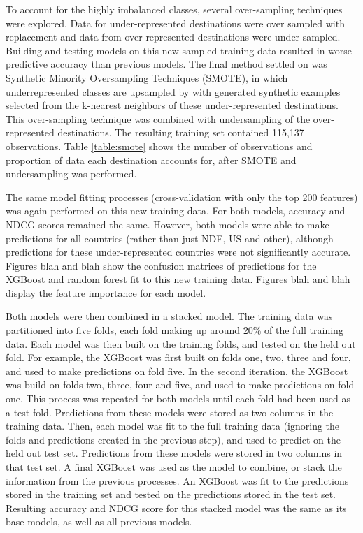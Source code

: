 \documentclass{article}
\begin{document}
To account for the highly imbalanced classes, several over-sampling techniques were explored. Data for under-represented
destinations were over sampled with replacement and data from over-represented destinations were under sampled. 
Building and testing models on this new sampled training data resulted in worse predictive accuracy than previous
models. The final method settled on was Synthetic Minority Oversampling Techniques (SMOTE), in which underrepresented
classes are upsampled by with generated synthetic examples selected from the k-nearest neighbors of these under-represented 
destinations. This over-sampling technique was combined with undersampling of the over-represented destinations. The 
resulting training set contained 115,137 observations. Table \ref{table:smote} shows the number of observations and proportion
of data each destination accounts for, after SMOTE and undersampling was performed. 

The same model fitting processes (cross-validation with only the top 200 features) was again performed 
on this new training data. For both models, accuracy and NDCG scores remained the same. However, both models were 
able to make predictions for all countries (rather than just NDF, US and other), although predictions for these 
under-represented countries were not significantly accurate. Figures blah and blah show the confusion matrices of predictions
for the XGBoost and random forest fit to this new training data. Figures blah and blah display the feature importance 
for each model. 


Both models were then combined in a stacked model. The training data was partitioned into five folds, each 
fold making up around 20\% of the full training data. Each model was then built on the training folds, and 
tested on the held out fold. For example, the XGBoost was first built on folds one, two, three and four, and 
used to make predictions on fold five. In the second iteration, the XGBoost was build on folds two, three, 
four and five, and used to make predictions on fold one. This process was repeated for both models until each 
fold had been used as a test fold. Predictions from these models were stored as two columns in the training data. 
Then, each model was fit to the full training data (ignoring the folds and predictions created in the
previous step), and used to predict on the held out test set. Predictions from these models were stored in two 
columns in that test set. A final XGBoost was used as the model to combine, or stack the information from the 
previous processes. An XGBoost was fit to the predictions stored in the training set and tested on the predictions 
stored in the test set. Resulting accuracy and NDCG score for this stacked model was the same as its base models, 
as well as all previous models. 
\end{document}
